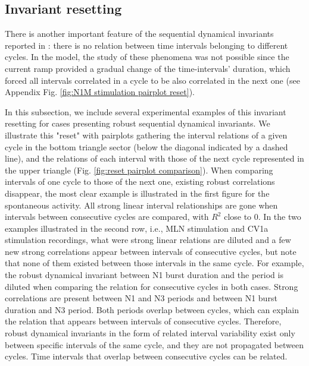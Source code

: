 \clearpage

\subsection{Invariant resetting}
There is another important feature of the sequential dynamical invariants reported in \textcite{elices_robust_2019}: there is no relation between time intervals belonging to different cycles. In the model, the study of these phenomena was not possible since the current ramp provided a gradual change of the time-intervals' duration, which forced all intervals correlated in a cycle to be also correlated in the next one (see Appendix Fig. \ref{fig:N1M stimulation pairplot reset}). 

In this subsection, we include several experimental examples of this invariant resetting for cases presenting robust sequential dynamical invariants. We illustrate this "reset" with pairplots gathering the interval relations of a given cycle in the bottom triangle sector (below the diagonal indicated by a dashed line), and the relations of each interval with those of the next cycle represented in the upper triangle (Fig. \ref{fig:reset pairplot comparison}). When comparing intervals of one cycle to those of the next one, existing robust  correlations disappear, the most clear example is illustrated in the first figure for the spontaneous activity. All strong linear interval relationships are gone when intervals between consecutive cycles are compared, with $R^2$ close to 0. In the two examples illustrated in the second row, i.e., MLN stimulation and CV1a stimulation recordings, what were strong linear relations are diluted and a few new strong correlations appear between intervals of consecutive cycles, but note that none of them existed between those intervals in the same cycle. For example, the robust dynamical invariant between N1 burst duration and the period is diluted when comparing the relation for consecutive cycles in both cases. Strong correlations are present between N1 and N3 periods and between N1 burst duration and N3 period. Both periods overlap between cycles, which can explain the relation that appears between intervals of consecutive cycles. Therefore, robust dynamical invariants in the form of related interval variability exist only between specific intervals of the same cycle, and they are not propagated between cycles. Time intervals that overlap between consecutive cycles can be related.


